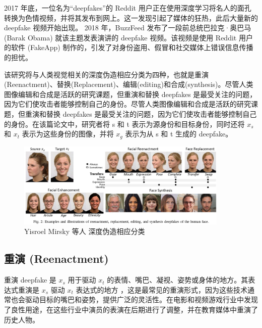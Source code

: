 2017 年底，一位名为“deepfakes”的 Reddit 用户正在使用深度学习将名人的面孔转换为色情视频，并将其发布到网上。这一发现引起了媒体的狂热，此后大量新的 deepfake 视频开始出现。 2018 年，BuzzFeed 发布了一段前总统巴拉克·奥巴马 (Barak Obama) 就该主题发表演讲的 deepfake 视频。该视频是使用 Reddit 用户的软件 (FakeApp) 制作的，引发了对身份盗用、假冒和社交媒体上错误信息传播的担忧。

该研究将与人类视觉相关的深度伪造相应分类为四种，也就是重演(Reenactment)、替换(Replacement)、编辑(editing)和合成(synthesis)。尽管人类图像编辑和合成是活跃的研究课题，但重演和替换 deepfakes 是最受关注的问题，因为它们使攻击者能够控制自己的身份。尽管人类图像编辑和合成是活跃的研究课题，但重演和替换 deepfakes 是最受关注的问题，因为它们使攻击者能够控制自己的身份。在该篇论文中，研究者将 s 和 t 表示为源身份和目标身份，同时还将 $x_s$ 和 $x_t$ 表示为这些身份的图像，并将 $x_g$ 表示为从 s 和 t 生成的 deepfake。

\begin{figure}[htb]
\centering 
\includegraphics[width=0.90\textwidth]{img/ch4m3.png} 
\caption{ Yisroel Mirsky 等人 \cite{DBLP:journals/corr/abs-2004-11138} 深度伪造相应分类}
\label{Test}
\end{figure}


\subsection{重演 (Reenactment)}

重演 deepfake 是 $x_s$ 用于驱动 $x_t$ 的表情、嘴巴、凝视、姿势或身体的地方。其表达式重演是 $x_s$ 驱动 $x_t$ 表达式的地方
，这是最常见的重演形式，因为这些技术通常也会驱动目标的嘴巴和姿势，提供广泛的灵活性。在电影和视频游戏行业中发现了良性用途，在这些行业中演员的表演在后期进行了调整，并在教育媒体中重演了历史人物。


